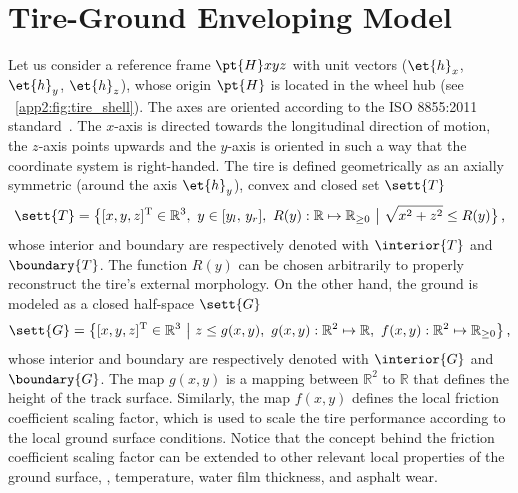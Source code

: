 
\section{Tire-Ground Enveloping Model}
\label{app2:sec:model}

Let us consider a reference frame $\pt{H}xyz$ with unit vectors ($\et{h}_x$, $\et{h}_y$, $\et{h}_z$), whose origin $\pt{H}$ is located in the wheel hub (see \figurename{}~\ref{app2:fig:tire_shell}). The axes are oriented according to the ISO 8855:2011 standard~\cite{iso88552011}. The $x$-axis is directed towards the longitudinal direction of motion, the $z$-axis points upwards and the $y$-axis is oriented in such a way that the coordinate system is right-handed. The tire is defined geometrically as an axially symmetric (around the axis $\et{h}_y$), convex and closed set $\sett{T}$
%
\begin{equation}
  \sett{T} = \big\{ [x, y, z]^\mathrm{T} \in \mathbb{R}^3, ~ y \in [ y_l, \, y_r ], ~ R(y):\mathbb{R} \mapsto \mathbb{R}_{\geq 0} ~ \big\lvert ~ \sqrt{x^2+z^2} \leq R(y) \big\}  \, \text{,}
\end{equation}
%
whose interior and boundary are respectively denoted with $\interior{T}$ and $\boundary{T}$. The function $R(y)$ can be chosen arbitrarily to properly reconstruct the tire's external morphology. On the other hand, the ground is modeled as a closed half-space $\sett{G}$
%
\begin{equation}
  \sett{G} = \big\{ [x, y, z]^\mathrm{T} \in \mathbb{R}^3 ~ \big\lvert ~ z \leq g(x,y), ~ g(x,y): \mathbb{R}^2 \mapsto \mathbb{R}, ~ f(x,y):\mathbb{R}^2 \mapsto \mathbb{R}_{\geq 0}\big\}  \, \text{,}
\end{equation}
%
whose interior and boundary are respectively denoted with $\interior{G}$ and $\boundary{G}$. The map $g(x,y)$ is a mapping between $\mathbb{R}^2$ to $\mathbb{R}$ that defines the height of the track surface. Similarly, the map $f(x,y)$ defines the local friction coefficient scaling factor, which is used to scale the tire performance according to the local ground surface conditions. Notice that the concept behind the friction coefficient scaling factor can be extended to other relevant local properties of the ground surface, \eg{}, temperature, water film thickness, and asphalt wear.

